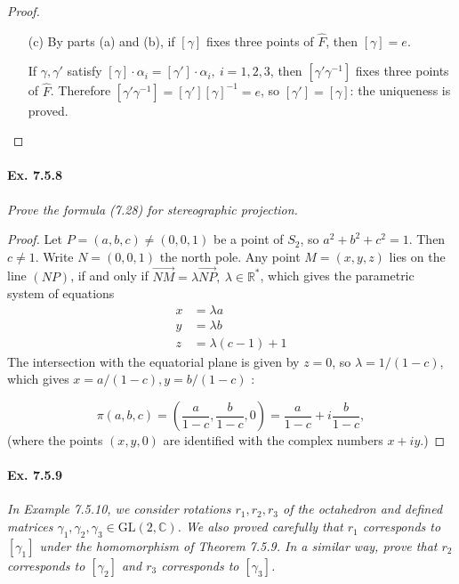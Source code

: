 \documentclass[11pt,a4paper]{article}
\newcommand{\R}{\mathbb{R}}
\newcommand{\C}{\mathbb{C}}
\begin{document}
\begin{proof}
\begin{enumerate}
\item[(c)]
By parts (a) and (b), if $[\gamma]$ fixes three points of $\hat{F}$, then $[\gamma] = e$.

If $\gamma, \gamma'$ satisfy $[\gamma]  \cdot \alpha_i  = [\gamma']\cdot \alpha_i, \ i=1,2,3$, then $[\gamma' \gamma^{-1}]$ fixes three points of $\hat{F}$. Therefore $[\gamma' \gamma^{-1}]=[\gamma'] [\gamma]^{-1} = e$, so $[\gamma'] = [\gamma]$: the uniqueness is proved.

\end{enumerate}
\end{proof}

\paragraph{Ex. 7.5.8}

{\it Prove the formula (7.28) for stereographic projection.
}

\begin{proof}
Let $P = (a,b,c) \neq (0,0,1)$ be a point of $S_2$, so $a^2+b^2+c^2=1$. Then $c\neq 1$. Write $N = (0,0,1)$ the north pole.
Any point $M = (x,y,z)$ lies on the line $(NP)$, if and only if $\overrightarrow{NM} = \lambda \overrightarrow{NP}, \ \lambda \in \R^*$, which gives the parametric system of equations
\begin{align*}
x &= \lambda a\\
y &=\lambda b\\
z&=\lambda(c-1)+1
\end{align*}
The intersection with the equatorial plane is given by $z=0$, so $\lambda = 1/(1-c)$, which gives $x=a/(1-c), y=b/(1-c)$ :

$$\pi(a,b,c) = \left(\frac{a}{1-c}, \frac{b}{1-c},0\right) = \frac{a}{1-c} + i \frac{b}{1-c},$$
(where the points $(x,y,0)$ are identified with the complex numbers $x+iy$.)
\end{proof}

\paragraph{Ex. 7.5.9}

{\it In Example 7.5.10, we consider rotations $r_1,r_2,r_3$ of the octahedron and defined matrices $\gamma_1,\gamma_2,\gamma_3 \in \mathrm{GL}(2,\C)$. We also proved carefully that $r_1$ corresponds to $[\gamma_1]$ under the homomorphism of Theorem 7.5.9. In a similar way, prove that $r_2$ corresponds to $[\gamma_2]$ and $r_3$ corresponds to $[\gamma_3]$.
}
\end{document}
